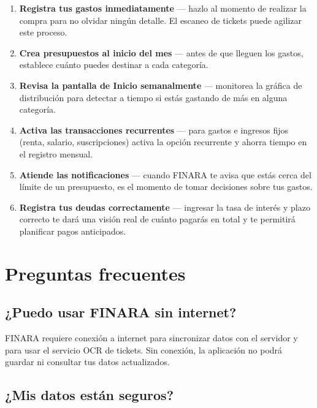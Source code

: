 \documentclass[a4paper,12pt]{report}
\begin{document}
\begin{enumerate}
  \item \textbf{Registra tus gastos inmediatamente} — hazlo al momento
    de realizar la compra para no olvidar ningún detalle. El escaneo de
    tickets puede agilizar este proceso.

  \item \textbf{Crea presupuestos al inicio del mes} — antes de que
    lleguen los gastos, establece cuánto puedes destinar a cada
    categoría.

  \item \textbf{Revisa la pantalla de Inicio semanalmente} — monitorea
    la gráfica de distribución para detectar a tiempo si estás gastando
    de más en alguna categoría.

  \item \textbf{Activa las transacciones recurrentes} — para gastos e
    ingresos fijos (renta, salario, suscripciones) activa la opción
    recurrente y ahorra tiempo en el registro mensual.

  \item \textbf{Atiende las notificaciones} — cuando FINARA te avisa que
    estás cerca del límite de un presupuesto, es el momento de tomar
    decisiones sobre tus gastos.

  \item \textbf{Registra tus deudas correctamente} — ingresar la tasa de
    interés y plazo correcto te dará una visión real de cuánto pagarás
    en total y te permitirá planificar pagos anticipados.
\end{enumerate}

\section{Preguntas frecuentes}

\subsection{¿Puedo usar FINARA sin internet?}

FINARA requiere conexión a internet para sincronizar datos con el
servidor y para usar el servicio OCR de tickets. Sin conexión, la
aplicación no podrá guardar ni consultar tus datos actualizados.

\subsection{¿Mis datos están seguros?}
\end{document}

